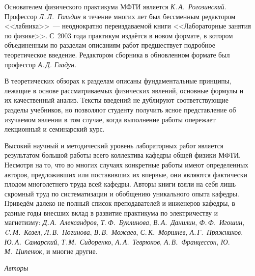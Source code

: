 Основателем физического практикума МФТИ является \textit{К.\,А.~Рогозинский}.
Профессор \textit{Л.\,Л.~Гольдин} в течение многих лет был бессменным 
редактором <<лабника>>~--- неоднократно переиздаваемой 
книги <<Лабораторные занятия по физике>>. С~2003 года
практикум издаётся в новом формате, в котором объединенным
по разделам описаниям работ предшествует подробное теоретическое введение.
Редактором сборника в обновленном формате был профессор \textit{А.\,Д. Гладун}.

В теоретических обзорах к разделам описаны фундаментальные принципы, лежащие 
в основе рассматриваемых физических явлений, основные формулы и их 
качественный анализ. Тексты введений не дублируют соответствующие разделы учебников,
но позволяют студенту получить ясное представление об изучаемом явлении 
в том случае, когда выполнение работы опережает лекционный и семинарский курс.

Высокий научный и методический уровень лабораторных работ является результатом 
большой работы всего коллектива кафедры общей физики МФТИ. Несмотря на то, что 
во многих случаях конкретные работы имеют определенных авторов, предложивших или
поставивших их впервые, они являются фактически плодом многолетнего труда всей 
кафедры. Авторы книги взяли на себя лишь скромный труд по систематизации и 
обобщению уникального опыта кафедры.
Приведём далеко не полный список преподавателей и инженеров кафедры, 
в разные годы внесших вклад в развитие практикума по электричеству и магнетизму: 
\textit{Д.\,А.~Александров}, \textit{Т.\,Ф.~Буклинова}, \textit{В.\,А.~Данилин}, 
\textit{Ф.\,Ф.~Игошин}, \textit{C.\,М.~Козел}, \textit{Л.\,В.~Ногинова}, 
\textit{В.\,В.~Можаев}, \textit{С.\,К.~Моршнев}, \textit{А.\,Г.~Пряжников}, 
\textit{Ю.\,А.~Самарский}, \textit{Т.\,М.~Сидоренко}, \textit{А.\,А.~Теврюков}, 
\textit{А.\,В.~Францессон}, \textit{Ю.\,М.~Ципенюк}, и многие другие.

\bigskip

{\raggedleft \textit{Авторы}\par}
